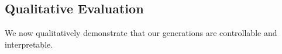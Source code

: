 \documentclass[11pt,a4paper]{article}
\begin{document}
\subsection{Qualitative Evaluation}
\label{sec:qualitative}
We now qualitatively demonstrate that our generations are controllable and interpretable.

\end{document}
